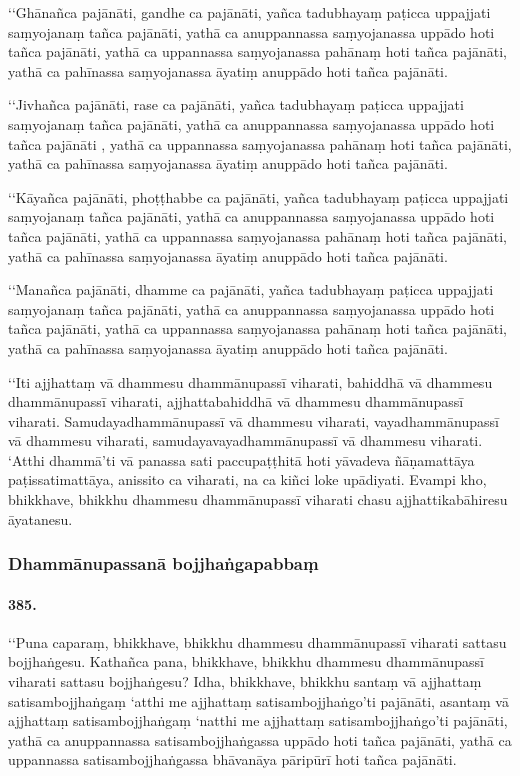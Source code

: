 ‘‘Ghānañca pajānāti, gandhe ca pajānāti, yañca tadubhayaṃ paṭicca uppajjati saṃyojanaṃ tañca pajānāti, yathā ca anuppannassa saṃyojanassa uppādo hoti tañca pajānāti, yathā ca uppannassa saṃyojanassa pahānaṃ hoti tañca pajānāti, yathā ca pahīnassa saṃyojanassa āyatiṃ anuppādo hoti tañca pajānāti.

‘‘Jivhañca pajānāti, rase ca pajānāti, yañca tadubhayaṃ paṭicca uppajjati saṃyojanaṃ tañca pajānāti, yathā ca anuppannassa saṃyojanassa uppādo hoti tañca pajānāti , yathā ca uppannassa saṃyojanassa pahānaṃ hoti tañca pajānāti, yathā ca pahīnassa saṃyojanassa āyatiṃ anuppādo hoti tañca pajānāti.

‘‘Kāyañca pajānāti, phoṭṭhabbe ca pajānāti, yañca tadubhayaṃ paṭicca uppajjati saṃyojanaṃ tañca pajānāti, yathā ca anuppannassa saṃyojanassa uppādo hoti tañca pajānāti, yathā ca uppannassa saṃyojanassa pahānaṃ hoti tañca pajānāti, yathā ca pahīnassa saṃyojanassa āyatiṃ anuppādo hoti tañca pajānāti.

‘‘Manañca pajānāti, dhamme ca pajānāti, yañca tadubhayaṃ paṭicca uppajjati saṃyojanaṃ tañca pajānāti, yathā ca anuppannassa saṃyojanassa uppādo hoti tañca pajānāti, yathā ca uppannassa saṃyojanassa pahānaṃ hoti tañca pajānāti, yathā ca pahīnassa saṃyojanassa āyatiṃ anuppādo hoti tañca pajānāti.

‘‘Iti ajjhattaṃ vā dhammesu dhammānupassī viharati, bahiddhā vā dhammesu dhammānupassī viharati, ajjhattabahiddhā vā dhammesu dhammānupassī viharati. Samudayadhammānupassī vā dhammesu viharati, vayadhammānupassī vā dhammesu viharati, samudayavayadhammānupassī vā dhammesu viharati. ‘Atthi dhammā’ti vā panassa sati paccupaṭṭhitā hoti yāvadeva ñāṇamattāya paṭissatimattāya, anissito ca viharati, na ca kiñci loke upādiyati. Evampi kho, bhikkhave, bhikkhu dhammesu dhammānupassī viharati chasu ajjhattikabāhiresu āyatanesu.


\subsubsection{Dhammānupassanā bojjhaṅgapabbaṃ}

\paragraph{385.} ‘‘Puna caparaṃ, bhikkhave, bhikkhu dhammesu dhammānupassī viharati sattasu bojjhaṅgesu. Kathañca pana, bhikkhave, bhikkhu dhammesu dhammānupassī viharati sattasu bojjhaṅgesu? Idha, bhikkhave, bhikkhu santaṃ vā ajjhattaṃ satisambojjhaṅgaṃ ‘atthi me ajjhattaṃ satisambojjhaṅgo’ti pajānāti, asantaṃ vā ajjhattaṃ satisambojjhaṅgaṃ ‘natthi me ajjhattaṃ satisambojjhaṅgo’ti pajānāti, yathā ca anuppannassa satisambojjhaṅgassa uppādo hoti tañca pajānāti, yathā ca uppannassa satisambojjhaṅgassa bhāvanāya pāripūrī hoti tañca pajānāti.

